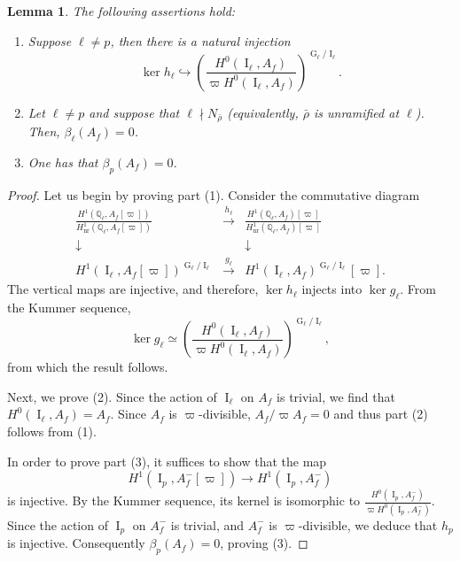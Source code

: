 \documentclass[table]{amsart}
\newtheorem{lemma}[theorem]{Lemma}
\newcommand{\Q}{\mathbb{Q}}
\newcommand{\op}[1]{\operatorname{#1}}
\numberwithin{equation}{section}
\begin{document}
\begin{lemma}\label{beta local lemma}
    The following assertions hold:
    \begin{enumerate}
        \item Suppose $\ell\neq p$, then there is a natural injection\begin{equation}\label{natural inj}\op{ker}h_\ell\hookrightarrow \left(\frac{H^0(\op{I}_\ell, A_f)}{\varpi H^0(\op{I}_\ell, A_f)}\right)^{\op{G}_\ell/\op{I}_\ell}.\end{equation}
        \item Let $\ell\neq p$ and suppose that $\ell\nmid N_{\bar{\rho}}$ (equivalently, $\bar{\rho}$ is unramified at $\ell$). Then, $\beta_\ell(A_f)=0$.
        \item One has that $\beta_p(A_f)=0$.
    \end{enumerate}
\end{lemma}
\begin{proof}
 Let us begin by proving part (1). Consider the commutative diagram
\[
\begin{array}{ccc}
\frac{H^1(\Q_\ell, A_f[\varpi])}{H^1_{\operatorname{nr}}(\Q_\ell, A_f[\varpi])} & \xrightarrow{h_\ell} & \frac{H^1(\Q_\ell, A_f)[\varpi]}{H^1_{\operatorname{nr}}(\Q_\ell, A_f)[\varpi]} \\
\downarrow^{} &  & \downarrow^{} \\
H^1(\op{I}_\ell, A_f[\varpi])^{\op{G}_\ell/\op{I}_\ell} & \xrightarrow{g_\ell} & H^1(\op{I}_\ell, A_f)^{\op{G}_\ell/\op{I}_\ell}[\varpi].
\end{array}
\]
The vertical maps are injective, and therefore, $\op{ker}h_\ell$ injects into $\op{ker} g_\ell$. From the Kummer sequence, 
\[\op{ker}g_\ell\simeq \left(\frac{H^0(\op{I}_\ell, A_f)}{\varpi H^0(\op{I}_\ell, A_f)}\right)^{\op{G}_\ell/\op{I}_\ell},\] from which the result follows.

\par Next, we prove (2). Since the action of $\op{I}_\ell$ on $A_f$ is trivial, we find that $H^0(\op{I}_\ell, A_f)=A_f$. Since $A_f$ is $\varpi$-divisible, $A_f/\varpi A_f=0$ and thus part (2) follows from (1).

\par In order to prove part (3), it suffices to show that the map 
\[H^1(\op{I}_p, A_f^-[\varpi])\rightarrow H^1(\op{I}_p, A_f^-)\] is injective. By the Kummer sequence, its kernel is isomorphic to $\frac{H^0(\op{I}_p, A_f^-)}{\varpi H^0(\op{I}_p, A_f^-)}$. Since the action of $\op{I}_p$ on $A_f^-$ is trivial, and $A_f^-$ is $\varpi$-divisible, we deduce that $h_p$ is injective. Consequently $\beta_p(A_f)=0$, proving (3).\end{proof}
\end{document}

